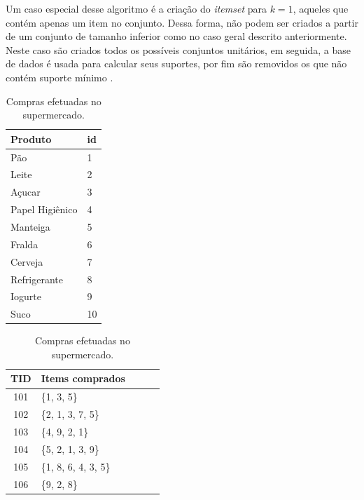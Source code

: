 Um caso especial desse algoritmo é a criação do \emph{itemset} para \(k = 1\), aqueles que contém apenas um item no conjunto. Dessa forma, não podem ser criados a partir de um conjunto de tamanho inferior como no caso geral descrito anteriormente. Neste caso são criados todos os possíveis conjuntos unitários, em seguida, a base de dados é usada para calcular seus suportes, por fim são removidos os que não contém suporte mínimo \cite{HanKamber2011}.
\begin{table}[!htbp]
 \caption{Bases de dados disponíveis para o gerente do supermercado.}
   \begin{subtable}{.5\linewidth}
    	\centering
   		\begin{tabular}{ll} \hline 
   		\textbf{Produto} & \textbf{id}	\\ \hline 
   		Pão              & 1	   		\\
   		Leite            & 2			\\
   		Açucar           & 3   			\\
   		Papel Higiênico  & 4   			\\
   		Manteiga         & 5   			\\
   		Fralda           & 6   			\\
   		Cerveja          & 7   			\\
   		Refrigerante     & 8  			\\
   		Iogurte          & 9   			\\
   		Suco	         & 10			\\ \hline
   		\end{tabular}
   		\caption{Produtos da base de dados.}   
   		\label{TABAPRIORI:PRODUTOSMERCADO}		
   \end{subtable}%
   \begin{subtable}{.5\linewidth}
   		\centering
   		\begin{tabular}{cllll} \hline 
   		\textbf{TID} & \textbf{Items comprados}		\\ \hline 
   		101                & \{1, 3, 5\}			\\
   		102                & \{2, 1, 3, 7, 5\}	 	\\
   		103                & \{4, 9, 2, 1\}    		\\
   		104                & \{5, 2, 1, 3, 9\}   	\\
   		105                & \{1, 8, 6, 4, 3, 5\}	\\
   		106                & \{9, 2, 8\}  			\\ \hline
   		\end{tabular}
   		 \caption{Compras efetuadas no supermercado.}
   		 \label{TABAPRIORI:ITEMSETS}
   \end{subtable}
\label{TABAPRIORI}
\vspace{0.1cm}
\end{table}

